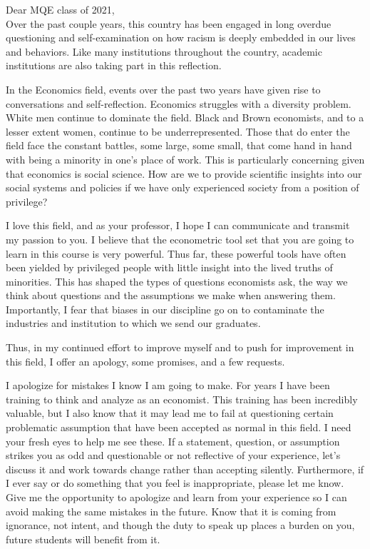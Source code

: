\documentclass[a4paper, 10pt]{article}
\begin{document}
\vspace{10mm}
\linespread{1.25}
\bigskip
Dear MQE class of 2021,\\ 


Over the past couple years, this country has been engaged in long overdue questioning and self-examination on how racism is deeply embedded in our lives and behaviors. Like many institutions throughout the country, academic institutions are also taking part in this reflection. 

In the Economics field, events over the past two years  have given rise to conversations and self-reflection. Economics struggles with a diversity problem. White men continue to dominate the field. Black and Brown economists, and to a lesser extent women, continue to be underrepresented. Those that do enter the field face the constant battles, some large, some small, that come hand in hand with being a minority in one's place of work. This is particularly concerning given that economics is social science. How are we to provide scientific insights into our social systems and policies if we have only experienced society from a position of privilege?

I love this field, and as your professor, I hope I can communicate and transmit my passion to you. I believe that the econometric tool set that you are going to learn in this course is very powerful. Thus far, these powerful tools have often been yielded by privileged people with little insight into the lived truths of minorities. This has shaped the types of questions economists ask, the way we think about questions and the assumptions we make when answering them. Importantly, I fear that biases in our discipline go on to contaminate the industries and institution to which we send our graduates. 

Thus, in my continued effort to improve myself and to push for improvement in this field, I offer an apology, some promises, and a few requests.  


I apologize for mistakes I know I am going to make. For years I have been training to think and analyze as an economist. This training has been incredibly valuable, but I also know that it may lead me to fail at questioning certain problematic assumption that have been accepted as normal in this field.  I need your fresh eyes to help me see these. If a statement, question, or assumption strikes you as odd and questionable or not reflective of your experience, let's discuss it and work towards change rather than accepting silently. Furthermore, if I ever say or do something that you feel is inappropriate, please let me know. Give me the opportunity to apologize and learn from your experience so I can avoid making the same mistakes in the future. Know that it is coming from ignorance, not intent, and though the duty to speak up places a burden on you, future students will benefit from it.
\end{document}
